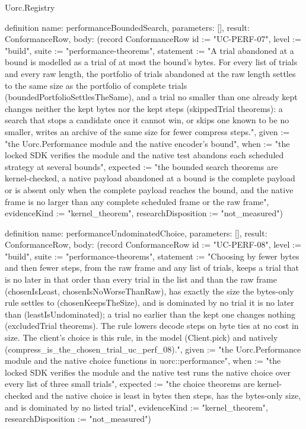 \begin{lexlean}{Uorc.Registry}
\begin{semanticmodule}
definition{
  name: performanceBoundedSearch,
  parameters: [],
  result: ConformanceRow,
  body: (record ConformanceRow {id := "UC-PERF-07", level := "build", suite := "performance-theorems", statement := "A trial abandoned at a bound is modelled as a trial of at most the bound's bytes. For every list of trials and every raw length, the portfolio of trials abandoned at the raw length settles to the same size as the portfolio of complete trials (boundedPortfolioSettlesTheSame), and a trial no smaller than one already kept changes neither the kept bytes nor the kept steps (skippedTrial theorems): a search that stops a candidate once it cannot win, or skips one known to be no smaller, writes an archive of the same size for fewer compress steps.", given := "the Uorc.Performance module and the native encoder's bound", when := "the locked SDK verifies the module and the native test abandons each scheduled strategy at several bounds", expected := "the bounded search theorems are kernel-checked, a native payload abandoned at a bound is the complete payload or is absent only when the complete payload reaches the bound, and the native frame is no larger than any complete scheduled frame or the raw frame", evidenceKind := "kernel_theorem", researchDisposition := "not_measured"})
}

definition{
  name: performanceUndominatedChoice,
  parameters: [],
  result: ConformanceRow,
  body: (record ConformanceRow {id := "UC-PERF-08", level := "build", suite := "performance-theorems", statement := "Choosing by fewer bytes and then fewer steps, from the raw frame and any list of trials, keeps a trial that is no later in that order than every trial in the list and than the raw frame (chosenIsLeast, chosenIsNoWorseThanRaw), has exactly the size the bytes-only rule settles to (chosenKeepsTheSize), and is dominated by no trial it is no later than (leastIsUndominated); a trial no earlier than the kept one changes nothing (excludedTrial theorems). The rule lowers decode steps on byte ties at no cost in size. The client's choice is this rule, in the model (Client.pick) and natively (compress_is_the_chosen_trial_uc_perf_08).", given := "the Uorc.Performance module and the native choice functions in uorc::performance", when := "the locked SDK verifies the module and the native test runs the native choice over every list of three small trials", expected := "the choice theorems are kernel-checked and the native choice is least in bytes then steps, has the bytes-only size, and is dominated by no listed trial", evidenceKind := "kernel_theorem", researchDisposition := "not_measured"})
}


\end{semanticmodule}
\end{lexlean}
